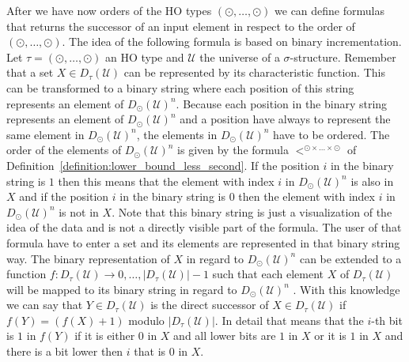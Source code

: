 After we have now orders of the HO types $(\odot, \dots, \odot)$ we can define formulas that returns the successor of
an input element in respect to the order of $(\odot, \dots, \odot)$. The idea of the following formula is based on
binary incrementation. Let $\tau = (\odot, \dots, \odot)$ an HO type and $\mathcal{U}$ the universe of a
$\sigma$-structure. Remember that a set $X \in D_\tau(\mathcal{U})$ can be represented by its characteristic
function. This can be transformed to a binary string where each position of this string represents an element of
$D_{\odot}(\mathcal{U})^n$. Because each position in the binary string represents an element of $D_{\odot}
(\mathcal{U})^n$ and a position have always to represent the same element in $D_{\odot}(\mathcal{U})^n$, the elements
in $D_{\odot}(\mathcal{U})^n$ have to be ordered. The order of the elements of $D_{\odot}(\mathcal{U})^n$ is given by
the formula $<^{\odot \times \dots \times \odot}$ of Definition~\ref{definition:lower_bound_less_second}. If the position
$i$ in the binary string is $1$ then this means that the element with index $i$ in $D_{\odot}(\mathcal{U})^n$ is
also in $X$ and if the position $i$ in the binary string is $0$ then the element with index $i$ in $D_{\odot}
(\mathcal{U})^n$ is not in $X$. Note that this binary string is just a visualization of the idea of the data and is
not a directly visible part of the formula. The user of that formula have to enter a set and its elements are
represented in that binary string way. The binary representation of $X$ in regard to $D_{\odot}(\mathcal{U})^n$ can be
extended to a function $f \colon D_\tau(\mathcal{U}) \rightarrow {0, \dots, |D_\tau(\mathcal{U})| - 1}$ such that
each element $X$ of $D_\tau(\mathcal{U})$ will be mapped to its binary string in regard to $D_{\odot}(\mathcal{U})^n$
. With this knowledge we can say that $Y \in D_\tau(\mathcal{U})$ is the direct successor of $X \in D_\tau
(\mathcal{U})$ if $f(Y) = (f(X) + 1)$ modulo $|D_\tau(\mathcal{U})|$. In detail that means that the $i$-th bit is $1$
in $f(Y)$ if it is either $0$ in $X$ and all lower bits are $1$ in $X$ or it is $1$ in $X$ and there is a bit lower
then $i$ that is $0$ in $X$.


